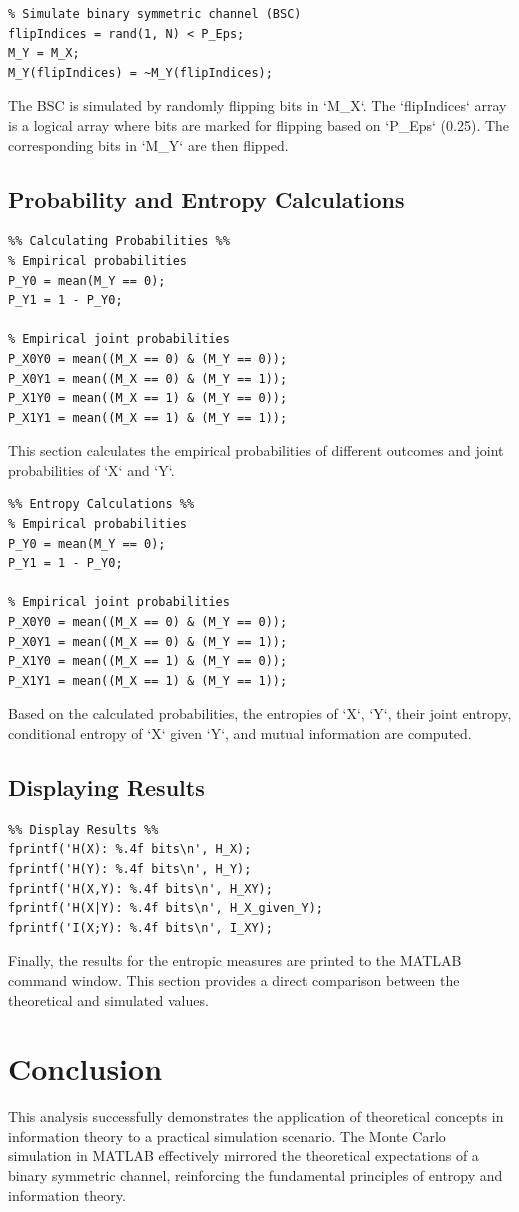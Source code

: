 \documentclass{article}
\begin{document}
\begin{verbatim}
% Simulate binary symmetric channel (BSC)
flipIndices = rand(1, N) < P_Eps;
M_Y = M_X;
M_Y(flipIndices) = ~M_Y(flipIndices);
\end{verbatim}
The BSC is simulated by randomly flipping bits in `M\_X`. The `flipIndices` array is a logical array where bits are marked for flipping based on `P\_Eps` (0.25). The corresponding bits in `M\_Y` are then flipped.

\subsection{Probability and Entropy Calculations}
\begin{verbatim}
%% Calculating Probabilities %%
% Empirical probabilities
P_Y0 = mean(M_Y == 0);
P_Y1 = 1 - P_Y0;

% Empirical joint probabilities
P_X0Y0 = mean((M_X == 0) & (M_Y == 0));
P_X0Y1 = mean((M_X == 0) & (M_Y == 1));
P_X1Y0 = mean((M_X == 1) & (M_Y == 0));
P_X1Y1 = mean((M_X == 1) & (M_Y == 1));

\end{verbatim}
This section calculates the empirical probabilities of different outcomes and joint probabilities of `X` and `Y`.

\begin{verbatim}
%% Entropy Calculations %%
% Empirical probabilities
P_Y0 = mean(M_Y == 0);
P_Y1 = 1 - P_Y0;

% Empirical joint probabilities
P_X0Y0 = mean((M_X == 0) & (M_Y == 0));
P_X0Y1 = mean((M_X == 0) & (M_Y == 1));
P_X1Y0 = mean((M_X == 1) & (M_Y == 0));
P_X1Y1 = mean((M_X == 1) & (M_Y == 1));

\end{verbatim}
Based on the calculated probabilities, the entropies of `X`, `Y`, their joint entropy, conditional entropy of `X` given `Y`, and mutual information are computed.

\subsection{Displaying Results}
\begin{verbatim}
%% Display Results %%
fprintf('H(X): %.4f bits\n', H_X);
fprintf('H(Y): %.4f bits\n', H_Y);
fprintf('H(X,Y): %.4f bits\n', H_XY);
fprintf('H(X|Y): %.4f bits\n', H_X_given_Y);
fprintf('I(X;Y): %.4f bits\n', I_XY);

\end{verbatim}
Finally, the results for the entropic measures are printed to the MATLAB command window. This section provides a direct comparison between the theoretical and simulated values.

\section{Conclusion}
This analysis successfully demonstrates the application of theoretical concepts in information theory to a practical simulation scenario. The Monte Carlo simulation in MATLAB effectively mirrored the theoretical expectations of a binary symmetric channel, reinforcing the fundamental principles of entropy and information theory.
\end{document}
